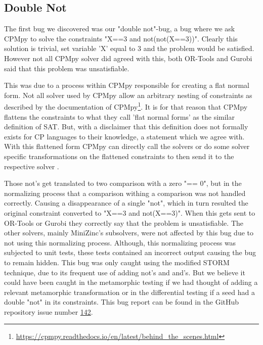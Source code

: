 \subsection{Double Not}
\label{res:bug:DoubleNot}
The first bug we discovered was our "double not"-bug, a bug where we ask CPMpy to solve the constraints "X==3 and not(not(X==3))". Clearly this solution is trivial, set variable 'X' equal to 3 and the problem would be satisfied. However not all CPMpy solver did agreed with this, both OR-Tools and Gurobi said that this problem was unsatisfiable. 

This was due to a process within CPMpy responsible for creating a flat normal form. Not all solver used by CPMpy allow an arbitrary nesting of constraints as described by the documentation of CPMpy\footnote{\url{https://cpmpy.readthedocs.io/en/latest/behind_the_scenes.html}}. It is for that reason that CPMpy flattens the constraints to what they call 'flat normal forms' as the similar definition of SAT. But, with a disclaimer that this definition does not formally exists for CP languages to their knowledge, a statement which we agree with. With this flattened form CPMpy can directly call the solvers or do some solver specific transformations on the flattened constraints to then send it to the respective solver \cite{CPMpyGithub}. 

Those not's get translated to two comparison with a zero "== 0", but in the normalizing process that a comparison withing a comparison was not handled correctly. Causing a disappearance of a single "not", which in turn resulted the original constraint converted to "X==3 and not(X==3)". When this gets sent to OR-Tools or Gurobi they correctly say that the problem is unsatisfiable. The other solvers, mainly MiniZinc's subsolvers, were not affected by this bug due to not using this normalizing process. Although, this normalizing process was subjected to unit tests, these tests contained an incorrect output causing the bug to remain hidden. This bug was only caught using the modified STORM technique, due to its frequent use of adding not's and and's. But we believe it could have been caught in the metamorphic testing if we had thought of adding a relevant metamorphic transformation or in the differential testing if a  seed had a double "not" in its constraints. This bug report can be found in the GitHub repository issue number \href{https://github.com/CPMpy/cpmpy/issues/142}{142}.



